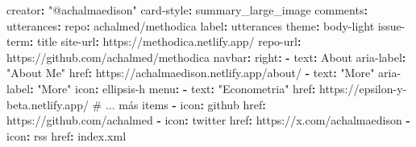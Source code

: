 \documentclass[
  doc,
  floatsintext,
  longtable,
  a4paper,
  nolmodern,
  notxfonts,
  notimes,
  12pt,
  colorlinks=true,linkcolor=blue,citecolor=blue,urlcolor=blue]{apa7}
\newenvironment{Shaded}{\begin{snugshade}}{\end{snugshade}}
\newcommand{\AttributeTok}[1]{\textcolor[rgb]{0.40,0.45,0.13}{#1}}
\newcommand{\CommentTok}[1]{\textcolor[rgb]{0.37,0.37,0.37}{#1}}
\newcommand{\FunctionTok}[1]{\textcolor[rgb]{0.28,0.35,0.67}{#1}}
\newcommand{\KeywordTok}[1]{\textcolor[rgb]{0.00,0.23,0.31}{\textbf{#1}}}
\newcommand{\StringTok}[1]{\textcolor[rgb]{0.13,0.47,0.30}{#1}}
\begin{document}
\begin{Shaded}
\begin{Highlighting}[]
\AttributeTok{    }\FunctionTok{creator}\KeywordTok{:}\AttributeTok{ }\StringTok{"@achalmaedison"}
\AttributeTok{    }\FunctionTok{card{-}style}\KeywordTok{:}\AttributeTok{ summary\_large\_image}
\AttributeTok{    }
\AttributeTok{  }\FunctionTok{comments}\KeywordTok{:}
\AttributeTok{    }\FunctionTok{utterances}\KeywordTok{:}
\AttributeTok{      }\FunctionTok{repo}\KeywordTok{:}\AttributeTok{ achalmed/methodica}
\AttributeTok{      }\FunctionTok{label}\KeywordTok{:}\AttributeTok{ utterances}
\AttributeTok{      }\FunctionTok{theme}\KeywordTok{:}\AttributeTok{ body{-}light}
\AttributeTok{      }\FunctionTok{issue{-}term}\KeywordTok{:}\AttributeTok{ title}
\AttributeTok{      }
\AttributeTok{  }\FunctionTok{site{-}url}\KeywordTok{:}\AttributeTok{ https://methodica.netlify.app/}
\AttributeTok{  }\FunctionTok{repo{-}url}\KeywordTok{:}\AttributeTok{ https://github.com/achalmed/methodica}
\AttributeTok{  }
\AttributeTok{  }\FunctionTok{navbar}\KeywordTok{:}
\AttributeTok{    }\FunctionTok{right}\KeywordTok{:}
\AttributeTok{      }\KeywordTok{{-}}\AttributeTok{ }\FunctionTok{text}\KeywordTok{:}\AttributeTok{ About}
\AttributeTok{        }\FunctionTok{aria{-}label}\KeywordTok{:}\AttributeTok{ }\StringTok{"About Me"}
\AttributeTok{        }\FunctionTok{href}\KeywordTok{:}\AttributeTok{ https://achalmaedison.netlify.app/about/}
\AttributeTok{      }\KeywordTok{{-}}\AttributeTok{ }\FunctionTok{text}\KeywordTok{:}\AttributeTok{ }\StringTok{"More"}
\AttributeTok{        }\FunctionTok{aria{-}label}\KeywordTok{:}\AttributeTok{ }\StringTok{"More"}
\AttributeTok{        }\FunctionTok{icon}\KeywordTok{:}\AttributeTok{ ellipsis{-}h}
\AttributeTok{        }\FunctionTok{menu}\KeywordTok{:}
\AttributeTok{          }\KeywordTok{{-}}\AttributeTok{ }\FunctionTok{text}\KeywordTok{:}\AttributeTok{ }\StringTok{"Econometria"}
\AttributeTok{            }\FunctionTok{href}\KeywordTok{:}\AttributeTok{ https://epsilon{-}y{-}beta.netlify.app/}
\CommentTok{          \# ... más items}
\AttributeTok{      }\KeywordTok{{-}}\AttributeTok{ }\FunctionTok{icon}\KeywordTok{:}\AttributeTok{ github}
\AttributeTok{        }\FunctionTok{href}\KeywordTok{:}\AttributeTok{ https://github.com/achalmed}
\AttributeTok{      }\KeywordTok{{-}}\AttributeTok{ }\FunctionTok{icon}\KeywordTok{:}\AttributeTok{ twitter}
\AttributeTok{        }\FunctionTok{href}\KeywordTok{:}\AttributeTok{ https://x.com/achalmaedison}
\AttributeTok{      }\KeywordTok{{-}}\AttributeTok{ }\FunctionTok{icon}\KeywordTok{:}\AttributeTok{ rss}
\AttributeTok{        }\FunctionTok{href}\KeywordTok{:}\AttributeTok{ index.xml}
\AttributeTok{        }

\end{Highlighting}
\end{Shaded}
\end{document}
